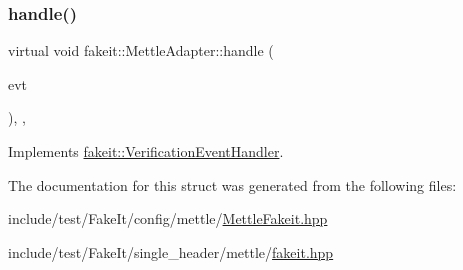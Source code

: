 \subsubsection{\texorpdfstring{handle()}{handle()}\hspace{0.1cm}{\footnotesize\ttfamily [6/6]}}
{\footnotesize\ttfamily virtual void fakeit\+::\+Mettle\+Adapter\+::handle (\begin{DoxyParamCaption}\item[{const \mbox{\hyperlink{structfakeit_1_1NoMoreInvocationsVerificationEvent}{No\+More\+Invocations\+Verification\+Event}} \&}]{evt }\end{DoxyParamCaption})\hspace{0.3cm}{\ttfamily [inline]}, {\ttfamily [override]}, {\ttfamily [virtual]}}



Implements \mbox{\hyperlink{structfakeit_1_1VerificationEventHandler_a826b9d15e23bad7013b219d8e45ef1d0}{fakeit\+::\+Verification\+Event\+Handler}}.



The documentation for this struct was generated from the following files\+:\begin{DoxyCompactItemize}
\item 
include/test/\+Fake\+It/config/mettle/\mbox{\hyperlink{MettleFakeit_8hpp}{Mettle\+Fakeit.\+hpp}}\item 
include/test/\+Fake\+It/single\+\_\+header/mettle/\mbox{\hyperlink{single__header_2mettle_2fakeit_8hpp}{fakeit.\+hpp}}\end{DoxyCompactItemize}

